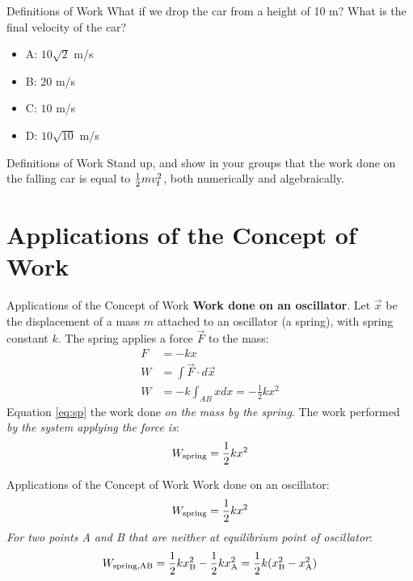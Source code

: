 \documentclass{beamer}
\begin{document}
\begin{frame}{Definitions of Work}
What if we drop the car from a height of 10 m?  What is the final velocity of the car?
\begin{itemize}
\item A: $10\sqrt{2}$ m/s
\item B: $20$ m/s
\item C: $10$ m/s
\item D: $10\sqrt{10}$ m/s
\end{itemize}
\end{frame}

\begin{frame}{Definitions of Work}
Stand up, and show in your groups that the work done on the falling car is equal to $\frac{1}{2}m v_{\rm f}^2$, both numerically and algebraically.
\end{frame}

\section{Applications of the Concept of Work}

\begin{frame}{Applications of the Concept of Work}
\textbf{Work done on an oscillator}.  Let $\vec{x}$ be the displacement of a mass $m$ attached to an oscillator (a spring), with spring constant $k$.  The spring applies a force $\vec{F}$ to the mass:
\begin{align}
F &= -kx \\
W &= \int \vec{F} \cdot d\vec{x} \\
W &= -k\int_{AB} x dx = -\frac{1}{2}k x^2 \label{eq:sp}
\end{align}
Equation \ref{eq:sp} the work done \textit{on the mass by the spring}.  The work performed \textit{by the system applying the force is}:
\begin{equation}
W_{\rm spring} = \frac{1}{2}k x^2
\end{equation}
\end{frame}

\begin{frame}{Applications of the Concept of Work}
Work done on an oscillator:
\begin{equation}
W_{\rm spring} = \frac{1}{2}k x^2
\end{equation}
\textit{For two points A and B that are neither at equilibrium point of oscillator}:
\begin{equation}
W_{\rm spring,AB} = \frac{1}{2}k x_{\rm B}^2 - \frac{1}{2}k x_{\rm A}^2 = \frac{1}{2}k(x_{\rm B}^2 - x_{\rm A}^2)
\end{equation}
\end{frame}
\end{document}
